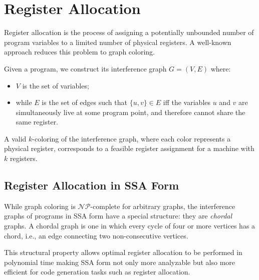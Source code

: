 \section{Register Allocation}
\label{sec:ra}

Register allocation is the process of assigning a potentially unbounded number of program variables to a limited number of physical registers. A well-known approach reduces this problem to graph coloring.

Given a program, we construct its interference graph $G = (V, E)$ where:

\begin{itemize}
    \item $V$ is the set of variables;
    \item while $E$ is the set of edges such that $\{ u, v \} \in E$ iff the variables $u$ and $v$ are simultaneously live at some program point, and therefore cannot share the same register.
\end{itemize}

A valid $k$-coloring of the interference graph, where each color represents a physical register, corresponds to a feasible register assignment for a machine with $k$ registers.

\subsection{Register Allocation in SSA Form}

While graph coloring is $\mathcal{NP}$-complete for arbitrary graphs, the interference graphs of programs in SSA form have a special structure: they are \textit{chordal} graphs. A chordal graph is one in which every cycle of four or more vertices has a chord, i.e., an edge connecting two non-consecutive vertices.

This structural property allows optimal register allocation to be performed in polynomial time making SSA form not only more analyzable but also more efficient for code generation tasks such as register allocation.